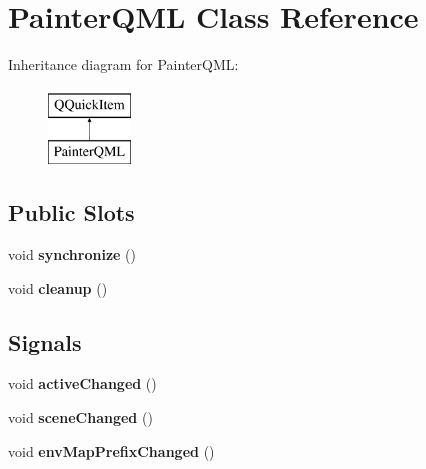 \hypertarget{class_painter_q_m_l}{}\section{Painter\+Q\+M\+L Class Reference}
\label{class_painter_q_m_l}
Inheritance diagram for Painter\+Q\+M\+L\+:\begin{figure}[H]
\begin{center}
\leavevmode
\includegraphics[height=2.000000cm]{class_painter_q_m_l}
\end{center}
\end{figure}
\subsection*{Public Slots}
\begin{DoxyCompactItemize}
\item 
\hypertarget{class_painter_q_m_l_a4cfd22a52fc9e29d304c0ff7cea86744}{}void {\bfseries synchronize} ()\label{class_painter_q_m_l_a4cfd22a52fc9e29d304c0ff7cea86744}

\item 
\hypertarget{class_painter_q_m_l_ab07e4719d2b05bbbfa48980b4854d190}{}void {\bfseries cleanup} ()\label{class_painter_q_m_l_ab07e4719d2b05bbbfa48980b4854d190}

\end{DoxyCompactItemize}
\subsection*{Signals}
\begin{DoxyCompactItemize}
\item 
\hypertarget{class_painter_q_m_l_a90dae96b602fc324b707ffd56d2bb3d8}{}void {\bfseries active\+Changed} ()\label{class_painter_q_m_l_a90dae96b602fc324b707ffd56d2bb3d8}

\item 
\hypertarget{class_painter_q_m_l_a5fce3441beea885f9ba2a70b2f21f0ae}{}void {\bfseries scene\+Changed} ()\label{class_painter_q_m_l_a5fce3441beea885f9ba2a70b2f21f0ae}

\item 
\hypertarget{class_painter_q_m_l_ab7b3f62ef3f2bcbea8b215d4cfb859cd}{}void {\bfseries env\+Map\+Prefix\+Changed} ()\label{class_painter_q_m_l_ab7b3f62ef3f2bcbea8b215d4cfb859cd}

\end{DoxyCompactItemize}
